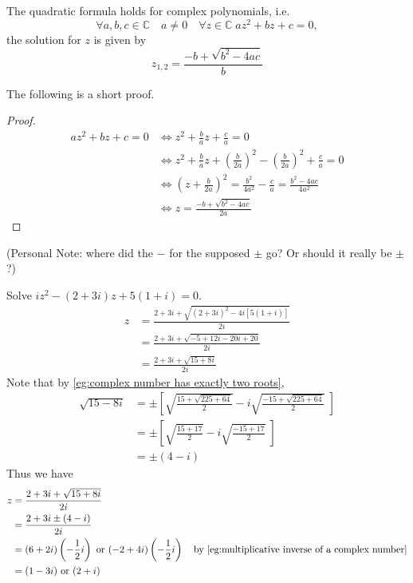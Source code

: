 \documentclass[11pt, oneside]{book}
\begin{document}
\begin{remark}\label{remark:quadratic formula for complex numbers}
	The quadratic formula holds for complex polynomials, i.e.
	\begin{equation*}
		\forall a, b, c \in \mathbb{C} \quad a \neq 0 \quad \forall z \in \mathbb{C} \; az^2 + bz + c = 0,
	\end{equation*}
	the solution for $z$ is given by
	\begin{equation}\label{eq:quadractic formula for complex numbers}
		z_{1, 2} = \frac{-b + \sqrt{b^2 - 4ac}}{b} 
	\end{equation}

	The following is a short proof.

	\begin{proof}
		\begin{align*}
			az^2 + bz + c = 0 &\iff z^2 + \frac{b}{a} z + \frac{c}{a} = 0 \\
				&\iff z^2 + \frac{b}{a} z + \left(\frac{b}{2a} \right)^2 - \left(\frac{b}{2a}\right)^2 + \frac{c}{a} = 0 \\
				&\iff \left(z + \frac{b}{2a} \right)^2 = \frac{b^2}{4a^2} - \frac{c}{a} = \frac{b^2 - 4ac}{4a^2} \\
				&\iff z = \frac{-b + \sqrt{b^2 - 4ac}}{2a}  
		\end{align*}
	\end{proof}

	(Personal Note: where did the $-$ for the supposed $\pm$ go? Or should it really be $\pm$?)
\end{remark}

\begin{eg}
	Solve $iz^2 - (2 + 3i)z + 5(1 + i) = 0$.
	\begin{align*}
		z &= \frac{2 + 3i + \sqrt{(2 + 3i)^2 - 4i[5(1 + i)]}}{2i} \\
			&= \frac{2 + 3i + \sqrt{-5 + 12i -20i + 20}}{2i} \\
			&= \frac{2 + 3i + \sqrt{15 + 8i}}{2i} 
	\end{align*}
	Note that by \cref{eg:complex number has exactly two roots},
	\begin{align*}
		\sqrt{15 - 8i} &= \pm \left[ \sqrt{\frac{15 + \sqrt{225 + 64}}{2} } - i \sqrt{\frac{-15 + \sqrt{225 + 64}}{2} } \; \right] \\
			&= \pm \left[ \sqrt{\frac{15 + 17}{2} } - i \sqrt{\frac{-15 + 17}{2} } \; \right] \\
			&= \pm (4 - i)
	\end{align*}
	Thus we have
	\begin{align*}
		z &= \frac{2 + 3i + \sqrt{15 + 8i}}{2i} \\
			&= \frac{2 + 3i \pm (4 - i)}{2i} \\
			&= (6 + 2i) \left( -\frac{1}{2}i \right) \text{ or } (-2 + 4i) \left( -\frac{1}{2} i \right) \quad \text{by } \cref{eg:multiplicative inverse of a complex number} \\
			&= (1 - 3i) \text{ or } (2 + i)
	\end{align*}
\end{eg}
\end{document}
